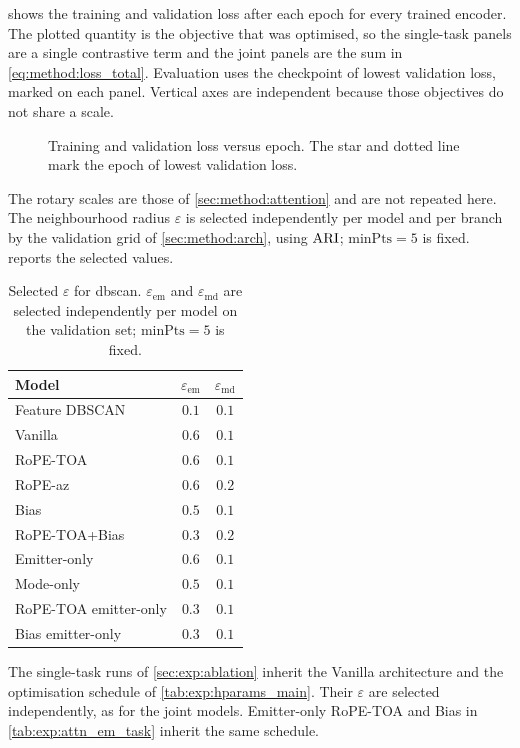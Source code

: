  shows the training and validation loss after each epoch for every trained encoder.
The plotted quantity is the objective that was optimised, so the single-task panels are a single contrastive term and the joint panels are the sum in \cref{eq:method:loss_total}.
Evaluation uses the checkpoint of lowest validation loss, marked on each panel.
Vertical axes are independent because those objectives do not share a scale.

\begin{figure}[tbp]
  \centering
  \caption{Training and validation loss versus epoch. The star and dotted line mark the epoch of lowest validation loss.}
  \label{fig:exp:loss_curves}
\end{figure}

The rotary scales are those of \cref{sec:method:attention} and are not repeated here.
The neighbourhood radius $\varepsilon$ is selected independently per model and per branch by the validation grid of \cref{sec:method:arch}, using $\mathrm{ARI}$; $\mathrm{minPts}=5$ is fixed.
 reports the selected values.

\begin{table}[tbp]
  \centering
  \caption{Selected $\varepsilon$ for \gls{dbscan}. $\varepsilon_{\mathrm{em}}$ and $\varepsilon_{\mathrm{md}}$ are selected independently per model on the validation set; $\mathrm{minPts}=5$ is fixed.}
  \label{tab:exp:hparams_attn}
  \begin{tabular}{@{}lcc@{}}
    \toprule
    Model & $\varepsilon_{\mathrm{em}}$ & $\varepsilon_{\mathrm{md}}$ \\
    \midrule
    Feature DBSCAN & $0.1$ & $0.1$ \\
    Vanilla   & $0.6$ & $0.1$ \\
    RoPE-TOA  & $0.6$ & $0.1$ \\
    RoPE-az   & $0.6$ & $0.2$ \\
    Bias      & $0.5$ & $0.1$ \\
    RoPE-TOA+Bias & $0.3$ & $0.2$ \\
    \midrule
    Emitter-only & $0.6$ & $0.1$ \\
    Mode-only & $0.5$ & $0.1$ \\
    RoPE-TOA emitter-only & $0.3$ & $0.1$ \\
    Bias emitter-only & $0.3$ & $0.1$ \\
    \bottomrule
  \end{tabular}
\end{table}

The single-task runs of \cref{sec:exp:ablation} inherit the Vanilla architecture and the optimisation schedule of \cref{tab:exp:hparams_main}.
Their $\varepsilon$ are selected independently, as for the joint models.
Emitter-only RoPE-TOA and Bias in \cref{tab:exp:attn_em_task} inherit the same schedule.
